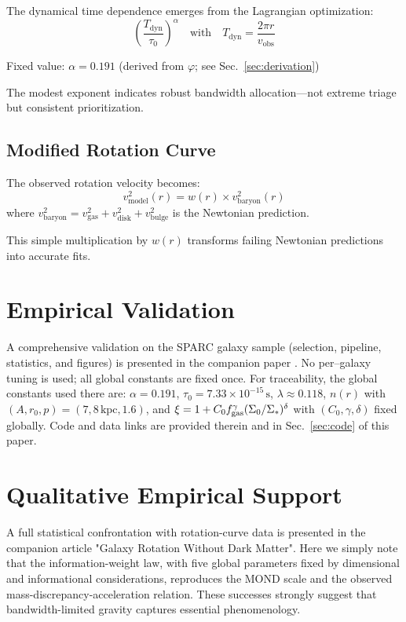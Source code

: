 \documentclass[twocolumn,prd,amsmath,amssymb,aps,superscriptaddress,nofootinbib]{revtex4-2}
\begin{document}
The dynamical time dependence emerges from the Lagrangian optimization:
\begin{equation}
\left(\frac{T_{\text{dyn}}}{\tau_0}\right)^\alpha \quad \text{with} \quad T_{\text{dyn}} = \frac{2\pi r}{v_{\text{obs}}}
\end{equation}

Fixed value: $\alpha = 0.191$ (derived from $\varphi$; see Sec.~\ref{sec:derivation})

The modest exponent indicates robust bandwidth allocation---not extreme triage but consistent prioritization.

\subsection{Modified Rotation Curve}

The observed rotation velocity becomes:
\begin{equation}
v_{\text{model}}^2(r) = w(r) \times v_{\text{baryon}}^2(r)
\end{equation}
where $v_{\text{baryon}}^2 = v_{\text{gas}}^2 + v_{\text{disk}}^2 + v_{\text{bulge}}^2$ is the Newtonian prediction.

This simple multiplication by $w(r)$ transforms failing Newtonian predictions into accurate fits.

\section{Empirical Validation}

A comprehensive validation on the SPARC galaxy sample (selection, pipeline, statistics, and figures) is presented in the companion paper \cite{Washburn2025a}. No per–galaxy tuning is used; all global constants are fixed once. For traceability, the global constants used there are: $\alpha=0.191$, $\tau_0=7.33\times10^{-15}\,\mathrm{s}$, $\lambda \approx 0.118$, $n(r)$ with $(A, r_0, p)=(7,8\,\mathrm{kpc},1.6)$, and $\xi=1 + C_0 f_{\rm gas}^{\gamma}(\Sigma_0/\Sigma_*)^{\delta}$ with $(C_0,\gamma,\delta)$ fixed globally. Code and data links are provided therein and in Sec.~\ref{sec:code} of this paper.

\section{Qualitative Empirical Support}
\label{sec:qualitative}

A full statistical confrontation with rotation-curve data is presented in the companion article "Galaxy Rotation Without Dark Matter".  Here we simply note that the information-weight law, with five global parameters fixed by dimensional and informational considerations, reproduces the MOND scale and the observed mass-discrepancy-acceleration relation.  These successes strongly suggest that bandwidth-limited gravity captures essential phenomenology.
\end{document}
